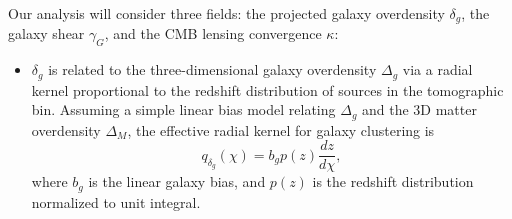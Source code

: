 \documentclass[a4paper,11pt]{article}
\begin{document}
      Our analysis will consider three fields: the projected galaxy overdensity $\delta_g$, the galaxy shear $\gamma_G$, and the CMB lensing convergence $\kappa$:
      \begin{itemize}
        \item $\delta_g$ is related to the three-dimensional galaxy overdensity $\Delta_g$ via a radial kernel proportional to the redshift distribution of sources in the tomographic bin. Assuming a simple linear bias model relating $\Delta_g$ and the 3D matter overdensity $\Delta_M$, the effective radial kernel for galaxy clustering is
        \begin{equation}
          q_{\delta_g}(\chi)=b_gp(z)\frac{dz}{d\chi},
        \end{equation}
        where $b_g$ is the linear galaxy bias, and $p(z)$ is the redshift distribution normalized to unit integral.


\end{itemize}
\end{document}
